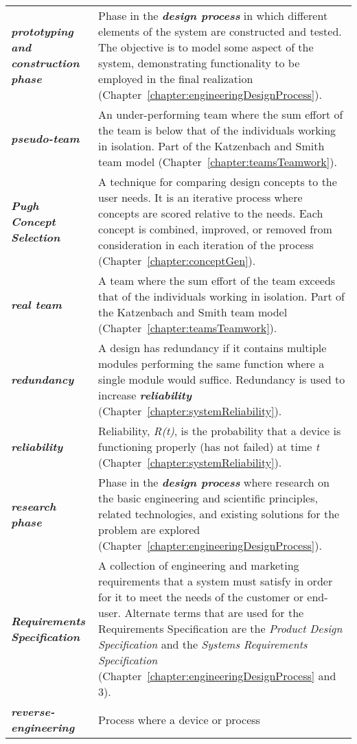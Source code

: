 \begin{longtable} { p{4cm} p{11cm}}
\emph{\textbf{prototyping and construction phase}} & Phase in the
\emph{\textbf{design process}} in which different elements of the system
are constructed and tested. The objective is to model some aspect of the
system, demonstrating functionality to be employed in the final
realization (Chapter~\ref{chapter:engineeringDesignProcess}). \\
\emph{\textbf{pseudo-team}} & An under-performing team where the sum
effort of the team is below that of the individuals working in
isolation. Part of the Katzenbach and Smith team model (Chapter~\ref{chapter:teamsTeamwork}). \\
\emph{\textbf{Pugh Concept Selection}} & A technique for comparing
design concepts to the user needs. It is an iterative process where
concepts are scored relative to the needs. Each concept is combined,
improved, or removed from consideration in each iteration of the process
(Chapter~\ref{chapter:conceptGen}). \\
\emph{\textbf{real team}} & A team where the sum effort of the team
exceeds that of the individuals working in isolation. Part of the
Katzenbach and Smith team model (Chapter~\ref{chapter:teamsTeamwork}). \\
\emph{\textbf{redundancy}} & A design has redundancy if it contains
multiple modules performing the same function where a single module
would suffice. Redundancy is used to increase
\emph{\textbf{reliability}} (Chapter~\ref{chapter:systemReliability}). \\
\emph{\textbf{reliability}} & Reliability, \emph{R(t)}, is the
probability that a device is functioning properly (has not failed) at
time \emph{t} (Chapter~\ref{chapter:systemReliability}). \\
\emph{\textbf{research phase}} & Phase in the \emph{\textbf{design
process}} where research on the basic engineering and scientific
principles, related technologies, and existing solutions for the problem
are explored (Chapter~\ref{chapter:engineeringDesignProcess}). \\
\emph{\textbf{Requirements Specification}} & A collection of engineering
and marketing requirements that a system must satisfy in order for it to
meet the needs of the customer or end-user. Alternate terms that are
used for the Requirements Specification are the \emph{Product Design
Specification} and the \emph{Systems Requirements Specification}
(Chapter~\ref{chapter:engineeringDesignProcess} and 3). \\
\emph{\textbf{reverse-engineering}} & Process where a device or process

\end{longtable}
